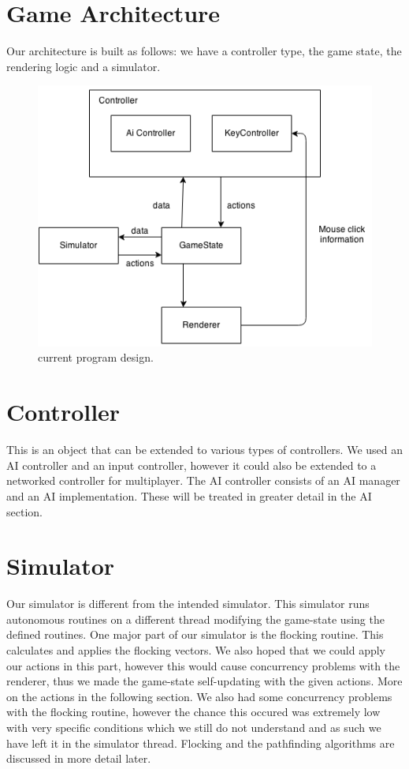 \section{Game Architecture}
Our architecture is built as follows: we have a controller type, the game state, the rendering logic and a simulator. 

\begin{figure}[htbp]
	\centering
	\includegraphics[scale=1]{CZHV_Diagram.png}
	\caption{current program design.}
\end{figure}

\FloatBarrier

\section{Controller}
This is an object that can be extended to various types of controllers. We used an AI controller and an input controller, however it could also be extended to a networked controller for multiplayer. The AI controller consists of an AI manager and an AI implementation. These will be treated in greater detail in the AI section.
\section{Simulator}
Our simulator is different from the intended simulator. This simulator runs autonomous routines on a different thread modifying the game-state using the defined routines. One major part of our simulator is the flocking routine. This calculates and applies the flocking vectors. We also hoped that we could apply our actions in this part, however this would cause concurrency problems with the renderer, thus we made the game-state self-updating with the given actions. More on the actions in the following section. We also had some concurrency problems with the flocking routine, however the chance this occured was extremely low with very specific conditions which we still do not understand and as such we have left it in the simulator thread. Flocking and the pathfinding algorithms are discussed in more detail later.
